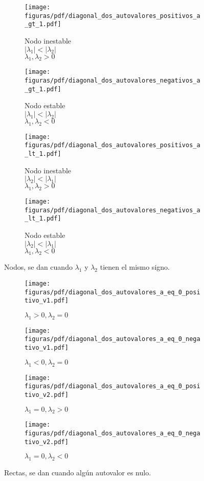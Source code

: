 \documentclass[../ecuaciones_diferenciales.tex]{subfiles}
\begin{document}
\begin{figure}[ht]
  \centering
  \begin{subfigure}{0.25\textwidth}
    \centering
    \texttt{[image: figuras/pdf/diagonal\_dos\_autovalores\_positivos\_a\_gt\_1.pdf]}
    \caption*{Nodo inestable \\ \(|\lambda_1| < |\lambda_2|\) \\ \(\lambda_1, \lambda_2 > 0\)}
  \end{subfigure}%
  \begin{subfigure}{0.25\textwidth}
    \centering
    \texttt{[image: figuras/pdf/diagonal\_dos\_autovalores\_negativos\_a\_gt\_1.pdf]}
    \caption*{Nodo estable \\ \(|\lambda_1| < |\lambda_2|\) \\ \(\lambda_1, \lambda_2 < 0\)}
  \end{subfigure}%
  \begin{subfigure}{0.25\textwidth}
    \centering
    \texttt{[image: figuras/pdf/diagonal\_dos\_autovalores\_positivos\_a\_lt\_1.pdf]}
    \caption*{Nodo inestable \\ \(|\lambda_2| < |\lambda_1|\) \\ \(\lambda_1, \lambda_2 > 0\)}
  \end{subfigure}%
  \begin{subfigure}{0.25\textwidth}
    \centering
    \texttt{[image: figuras/pdf/diagonal\_dos\_autovalores\_negativos\_a\_lt\_1.pdf]}
    \caption*{Nodo estable \\ \(|\lambda_2| < |\lambda_1|\) \\ \(\lambda_1, \lambda_2 < 0\)}
  \end{subfigure}
  \caption{Nodos, se dan cuando \(\lambda_1\) y \(\lambda_2\) tienen el mismo signo.}
\end{figure}

\begin{figure}[ht]
  \centering
  \begin{subfigure}{0.25\textwidth}
    \centering
    \texttt{[image: figuras/pdf/diagonal\_dos\_autovalores\_a\_eq\_0\_positivo\_v1.pdf]}
    \caption*{\(\lambda_1 > 0, \lambda_2 = 0\)}
  \end{subfigure}%
  \begin{subfigure}{0.25\textwidth}
    \centering
    \texttt{[image: figuras/pdf/diagonal\_dos\_autovalores\_a\_eq\_0\_negativo\_v1.pdf]}
    \caption*{\(\lambda_1 < 0, \lambda_2 = 0\)}
  \end{subfigure}%
  \begin{subfigure}{0.25\textwidth}
    \centering
    \texttt{[image: figuras/pdf/diagonal\_dos\_autovalores\_a\_eq\_0\_positivo\_v2.pdf]}
    \caption*{\(\lambda_1 = 0, \lambda_2 > 0\)}
  \end{subfigure}%
  \begin{subfigure}{0.25\textwidth}
    \centering
    \texttt{[image: figuras/pdf/diagonal\_dos\_autovalores\_a\_eq\_0\_negativo\_v2.pdf]}
    \caption*{\(\lambda_1 = 0, \lambda_2 < 0\)}
  \end{subfigure}
  \caption{Rectas, se dan cuando algún autovalor es nulo.}
\end{figure}
\end{document}
